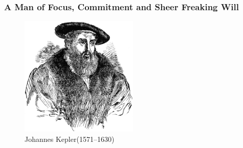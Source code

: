 \begin{frame}
    \frametitle{A Man of Focus, Commitment and Sheer Freaking Will}
      \begin{figure}[!htbp]
        \centering
        \includegraphics[width=0.5\textwidth]{./data/image/kepler.png}
      \caption{Johannes Kepler(1571--1630)}
      \label{image:kepler}
      \end{figure}
    \end{frame}
    
